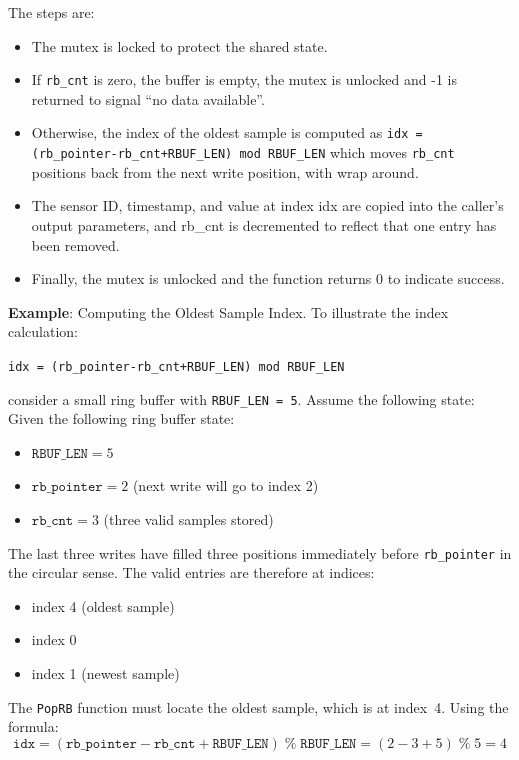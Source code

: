 The steps are:
\begin{itemize}
	\item The mutex is locked to protect the shared state.
	\item If \texttt{rb\_cnt} is zero, the buffer is empty, the mutex is unlocked and -1 is returned to signal “no data available”.
	\item Otherwise, the index of the oldest sample is computed as
\texttt{idx = (rb\_pointer-rb\_cnt+RBUF\_LEN) mod RBUF\_LEN}
which moves \texttt{rb\_cnt} positions back from the next write position, with wrap around.
	\item The sensor ID, timestamp, and value at index idx are copied into the caller’s output parameters, and rb\_cnt is decremented to reflect that one entry has been removed.
	\item Finally, the mutex is unlocked and the function returns 0 to indicate success.
\end{itemize}

\textbf{Example}: Computing the Oldest Sample Index. 
To illustrate the index calculation:
\begin{center}
\texttt{idx = (rb\_pointer-rb\_cnt+RBUF\_LEN) mod RBUF\_LEN}
\end{center}
consider a small ring buffer with \texttt{RBUF\_LEN = 5}. Assume the following state:
Given the following ring buffer state:
\begin{itemize}
    \item $\texttt{RBUF\_LEN} = 5$
    \item $\texttt{rb\_pointer} = 2$ (next write will go to index 2)
    \item $\texttt{rb\_cnt} = 3$ (three valid samples stored)
\end{itemize}

The last three writes have filled three positions immediately before
\texttt{rb\_pointer} in the circular sense. The valid entries are therefore
at indices:
\begin{itemize}
    \item index 4 \quad (oldest sample)
    \item index 0
    \item index 1 \quad (newest sample)
\end{itemize}

The \texttt{PopRB} function must locate the oldest sample, which is at index~4.
Using the formula:
\[
    \texttt{idx} = (\texttt{rb\_pointer} - \texttt{rb\_cnt} + \texttt{RBUF\_LEN})
                  \;\%\; \texttt{RBUF\_LEN}
                = (2 - 3 + 5) \;\%\; 5 = 4
\]

